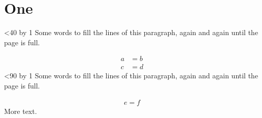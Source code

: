 \documentclass{article}
\begin{document}
\section{One}
\newcount\n {}
\loop\ifnum\n<40 \advance\n by 1
Some words to fill the lines of this paragraph, again and again until the page is full.
\repeat

\begin{align}
a&=b\\
c&=d
\end{align}
\loop\ifnum\n<90 \advance\n by 1
Some words to fill the lines of this paragraph, again and again until the page is full.
\repeat

\begin{gather}
e=f
\end{gather}
More text.
\end{document}
